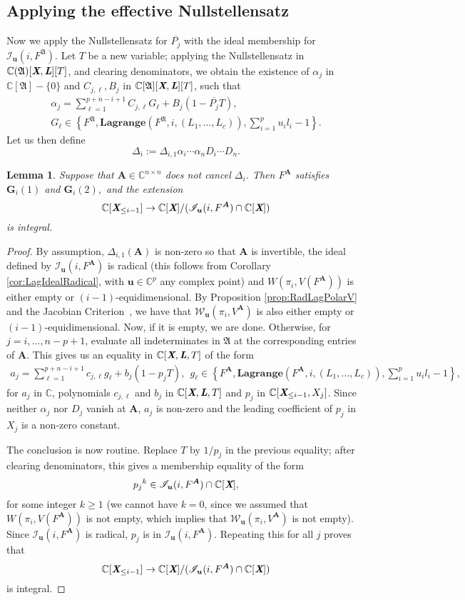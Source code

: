 \documentclass[a4paper]{article}
\def\A{\mathfrak{A}}
\def\Lb{\textit{\textbf{L}}}
\def\Xb{\textit{\textbf{X}}}
\def\mA{{\bm A}}
\def\ub{{\bm u}}
\def\pjb{\overline{P_{j}}}
\def\D{\Delta}
\def\C{\mathbb{C}}
\def\WiA{W(\pi_i,V(F^{\mA}))}
\def\lagFA{{\bm{Lagrange}}(F^{\mA},i,(L_1,\hdots,L_c))}
\def\lagFfA{{\bm{Lagrange}}(F^{\A},i,(L_1,\hdots,L_c))}
\def\IilA{\mathscr{I}_{\ub}(i,F^{\mA})}
\def\IilfA{\mathscr{I}_{\ub}(i,F^{\A})}
\def\WilA{\mathscr{W}_{\ub}(\pi_i,V^{\mA})}
\def\udl{\sum_{i=1}^pu_il_i}
\newtheorem{lemma}[theorem]{Lemma}
\begin{document}
\subsection{Applying the effective Nullstellensatz}
Now we apply the Nullstellensatz for $\pjb$ with the ideal membership for $\IilfA.$ Let $T$ be a new variable; applying the
Nullstellensatz in $\C(\A)[\Xb,\Lb][T]$, and clearing
denominators, we obtain the existence of $\alpha_j$ in
$\C[\A]-\{0\}$ and $ C_{j,\ell},B_j$ in
$\C[\A][\Xb,\Lb][T]$, such that
\begin{align*}
\alpha_j = \sum_{\ell=1}^{p+n-i+1} C_{j,\ell} G_\ell + B_j (1-\pjb T),\\  G_\ell \in 
\left\{ 
F^\A,\lagFfA, \udl-1
\right\}.
\end{align*}
Let us then define 
$$\D_{i}:=\D_{i,1} \alpha_i \cdots \alpha_n D_i \cdots D_n.$$

\begin{lemma}\label{lem:6.4}
Suppose that $\mA \in \C^{n\times n}$ does not cancel $\D_{i}$. Then $F^{\mA}$ satisfies $\bm G_i(1)$ and $\bm G_i(2),$ and the extension
\[
 \C[\Xb_{\leq i-1}]\rightarrow \C[\Xb]/(\IilA \cap \C[\Xb])
\]
is integral.
\end{lemma}

\begin{proof}
By assumption, $\D_{i,1}(\mA)$ is non-zero so that $\mA$ is
invertible, the
ideal defined by $\IilA$ is radical (this follows from Corollary \ref{cor:LagIdealRadical}, with $\ub \in \C^p$ any complex point) and 
$\WiA$ is either empty or $(i-1)$-equidimensional. By Proposition \ref{prop:RadLagPolarV} and the Jacobian Criterion~\cite[Corollary 16.20]{ECA}, we have that $\WilA$ is also either empty or $(i-1)$-equidimensional. Now, if
it is empty, we are done. Otherwise, for $j=i,\dots,n-p+1$, evaluate all indeterminates in $\A$ at the
corresponding entries of $\mA$. This gives us
an equality in $\C[\Xb,\Lb,T]$ of the form
\begin{align*}
a_j = \sum_{\ell=1}^{p+n-i+1} c_{j,\ell} g_\ell + b_j (1-p_j T),\ \  g_\ell \in 
\left\{ 
F^{\mA}, \lagFA, \udl-1
\right\},
\end{align*}
for $a_j$ in $\C$, polynomials $c_{j,\ell}$ and $b_j$ in
$\C[\Xb,\Lb,T]$ and $p_j$ in
$\C[\Xb_{\leq i-1},X_j]$. Since neither $\alpha_j$ nor $D_j$
vanish at $\mA$, $a_j$ is non-zero and the leading coefficient of
$p_j$ in $X_j$ is a non-zero constant.

The conclusion is now routine. Replace $T$ by $1/p_j$ in the
previous equality; after clearing denominators, this gives a
membership equality of the form 
\[
p_j{}^k \in \IilA \cap \C[\Xb],
\]
for some integer $k \ge 1$ (we cannot have $k=0$, since we assumed that $\WiA$ is not empty, which implies that $\WilA$ is not empty). Since $\IilA$ is radical,
$p_j$ is in $\IilA$. Repeating this for all $j$ proves that 
\[
\C[\Xb_{\leq i-1}]\rightarrow\C[\Xb]/(\IilA \cap \C[\Xb])
\]
is integral.
\end{proof}
\end{document}
